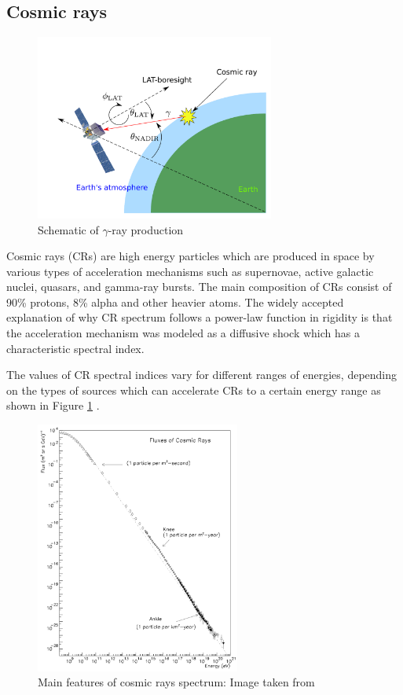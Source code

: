 \subsection{Cosmic rays}
\begin{figure}[h!]
    \centering
    \includegraphics[width=0.7\textwidth]{img/gamma_production_schematic}
    \caption{Schematic of $\gamma$-ray production}
\end{figure}
Cosmic rays (CRs) are high energy particles which are produced in space by various types
of acceleration mechanisms such as supernovae, active galactic nuclei, quasars, and
gamma-ray bursts. The main composition of CRs consist of 90\% protons, 8\% alpha
and other heavier atoms.
The widely accepted explanation of why CR spectrum follows a power-law function in rigidity is that the acceleration mechanism was modeled as a diffusive shock which has a characteristic spectral index.

\par The values of CR spectral indices vary for different ranges of energies, depending on the types of sources which can accelerate CRs to a certain energy range as shown in Figure \ref{fig:cr_famous_spectrum} \cite{Swordy2001}.
\begin{figure}[h!]
    \centering
    \includegraphics[width=0.6\textwidth]{img/Swordy}
    \caption{Main features of cosmic rays spectrum: Image taken from \citet{Swordy2001}}
    \label{fig:cr_famous_spectrum}
\end{figure}

